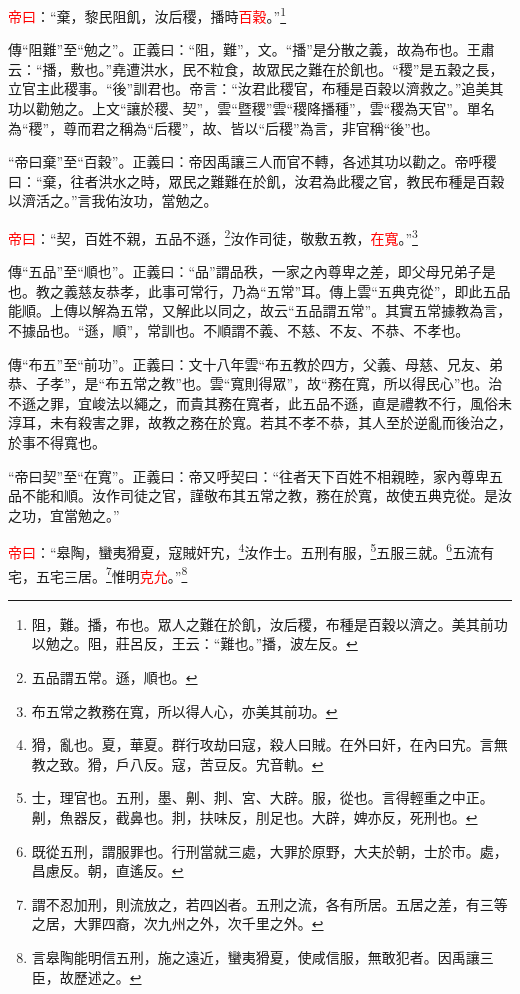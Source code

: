 \textcolor{red}{帝曰}：“棄，黎民阻飢，汝后稷，播時\textcolor{red}{百穀}。”\footnote{阻，難。播，布也。眾人之難在於飢，汝后稷，布種是百穀以濟之。美其前功以勉之。阻，莊呂反，王云：“難也。”播，波左反。}

{\noindent\zhuan{}\fzbyks 傳“阻難”至“勉之”。正義曰：“阻，難”，文。“播”是分散之義，故為布也。王肅云：“播，敷也。”堯遭洪水，民不粒食，故眾民之難在於飢也。“稷”是五穀之長，立官主此稷事。“後”訓君也。帝言：“汝君此稷官，布種是百穀以濟救之。”追美其功以勸勉之。上文“讓於稷、契”，雲“暨稷”雲“稷降播種”，雲“稷為天官”。單名為“稷”，尊而君之稱為“后稷”，故、皆以“后稷”為言，非官稱“後”也。 \par}

{\noindent\shu{}\fzkt “帝曰棄”至“百穀”。正義曰：帝因禹讓三人而官不轉，各述其功以勸之。帝呼稷曰：“棄，往者洪水之時，眾民之難難在於飢，汝君為此稷之官，教民布種是百穀以濟活之。”言我佑汝功，當勉之。 \par}

\textcolor{red}{帝曰}：“契，百姓不親，五品不遜，\footnote{五品謂五常。遜，順也。}汝作司徒，敬敷五教，\textcolor{red}{在寬}。”\footnote{布五常之教務在寬，所以得人心，亦美其前功。}

{\noindent\zhuan{}\fzbyks 傳“五品”至“順也”。正義曰：“品”謂品秩，一家之內尊卑之差，即父母兄弟子是也。教之義慈友恭孝，此事可常行，乃為“五常”耳。傳上雲“五典克從”，即此五品能順。上傳以解為五常，又解此以同之，故云“五品謂五常”。其實五常據教為言，不據品也。“遜，順”，常訓也。不順謂不義、不慈、不友、不恭、不孝也。 \par}

{\noindent\zhuan{}\fzbyks 傳“布五”至“前功”。正義曰：文十八年雲“布五教於四方，父義、母慈、兄友、弟恭、子孝”，是“布五常之教”也。雲“寬則得眾”，故“務在寬，所以得民心”也。治不遜之罪，宜峻法以繩之，而貴其務在寬者，此五品不遜，直是禮教不行，風俗未淳耳，未有殺害之罪，故教之務在於寬。若其不孝不恭，其人至於逆亂而後治之，於事不得寬也。 \par}

{\noindent\shu{}\fzkt “帝曰契”至“在寬”。正義曰：帝又呼契曰：“往者天下百姓不相親睦，家內尊卑五品不能和順。汝作司徒之官，謹敬布其五常之教，務在於寬，故使五典克從。是汝之功，宜當勉之。” \par}

\textcolor{red}{帝曰}：“皋陶，蠻夷猾夏，寇賊奸宄，\footnote{猾，亂也。夏，華夏。群行攻劫曰寇，殺人曰賊。在外曰奸，在內曰宄。言無教之致。猾，戶八反。寇，苦豆反。宄音軌。}汝作士。五刑有服，\footnote{士，理官也。五刑，墨、劓、剕、宮、大辟。服，從也。言得輕重之中正。劓，魚器反，截鼻也。剕，扶味反，刖足也。大辟，婢亦反，死刑也。}五服三就。\footnote{既從五刑，謂服罪也。行刑當就三處，大罪於原野，大夫於朝，士於市。處，昌慮反。朝，直遙反。}五流有宅，五宅三居。\footnote{謂不忍加刑，則流放之，若四凶者。五刑之流，各有所居。五居之差，有三等之居，大罪四裔，次九州之外，次千里之外。}惟明\textcolor{red}{克允}。”\footnote{言皋陶能明信五刑，施之遠近，蠻夷猾夏，使咸信服，無敢犯者。因禹讓三臣，故歷述之。}

